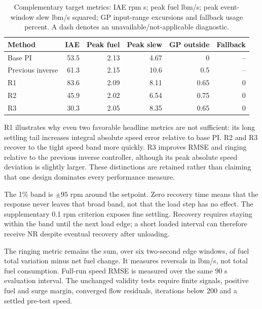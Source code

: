 \documentclass[11pt,a4paper]{article}
\begin{document}
\begin{table}[H]\centering\small\setlength{\tabcolsep}{5pt}
\begin{tabular}{@{}lrrrrr@{}}\toprule
Method & IAE & Peak fuel & Peak slew & GP outside & Fallback\\\midrule
Base PI & 53.5 & 2.13 & 4.67 & 0 & --\\
Previous inverse & 61.3 & 2.15 & 10.6 & 0.5 & --\\
R1 & 83.6 & 2.09 & 8.11 & 0.65 & 0\\
R2 & 45.9 & 2.02 & 6.54 & 0.75 & 0\\
R3 & 30.3 & 2.05 & 8.35 & 0.65 & 0\\
\bottomrule\end{tabular}\caption{Complementary target metrics: IAE rpm s; peak fuel lbm/s; peak event-window slew lbm/s squared; GP input-range excursions and fallback usage percent. A dash denotes an unavailable/not-applicable diagnostic.}\end{table}

R1 illustrates why even two favorable headline metrics are not sufficient: its long settling tail increases integral absolute speed error relative to base PI. R2 and R3 recover to the tight speed band more quickly. R3 improves RMSE and ringing relative to the previous inverse controller, although its peak absolute speed deviation is slightly larger. These distinctions are retained rather than claiming that one design dominates every performance measure.

The 1\% band is $\pm95$ rpm around the setpoint. Zero recovery time means that the response never leaves that broad band, not that the load step has no effect. The supplementary 0.1 rpm criterion exposes fine settling. Recovery requires staying within the band until the next load edge; a short loaded interval can therefore receive NR despite eventual recovery after unloading.

The ringing metric remains the sum, over six two-second edge windows, of fuel total variation minus net fuel change. It measures reversals in lbm/s, not total fuel consumption. Full-run speed RMSE is measured over the same 90 s evaluation interval. The unchanged validity tests require finite signals, positive fuel and surge margin, converged flow residuals, iterations below 200 and a settled pre-test speed.
\end{document}
